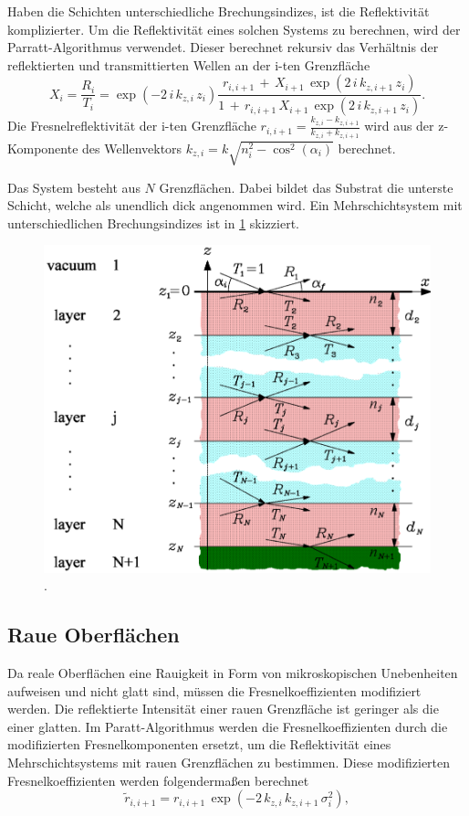 Haben die Schichten unterschiedliche Brechungsindizes, ist die Reflektivität komplizierter. Um die Reflektivität eines solchen Systems zu berechnen, wird der Parratt-Algorithmus verwendet.
Dieser berechnet rekursiv das Verhältnis der reflektierten und transmittierten Wellen an der i-ten Grenzfläche
\begin{equation}
    X_i = \frac{R_i}{T_i} = \exp(-2 \, i \, k_{z,i} \, z_i) \frac{r_{i, i+1} \, + \, X_{i+1} \, \exp(2 \, i \, k_{z,i+1} \, z_i)}{1 \, + \, r_{i,i+1} \, X_{i+1} \, \exp(2 \, i \, k_{z,i+1} \, z_i)}.
    \label{eq:parratt}
\end{equation}
Die Fresnelreflektivität der i-ten Grenzfläche $r_{i, i+1} = \frac{k_{z,i} - k_{z,i+1}}{k_{z,i} + k_{z,i+1}}$ wird aus der z-Komponente des Wellenvektors $k_{z,i} = k \sqrt{n^2_i - \cos^2(\alpha_i)}$ berechnet.

Das System besteht aus $N$ Grenzflächen. Dabei bildet das Substrat die unterste Schicht, welche als unendlich dick angenommen wird.
Ein Mehrschichtsystem mit unterschiedlichen Brechungsindizes ist in \ref{fig:Mehrschicht} skizziert.

\begin{figure}
    \centering
    \includegraphics[width=0.7\linewidth]{./figures/Mehrschicht.png}
    \caption{.}
    \label{fig:Mehrschicht}
\end{figure}



\subsection{Raue Oberflächen}
Da reale Oberflächen eine Rauigkeit in Form von mikroskopischen Unebenheiten aufweisen und nicht glatt sind, müssen die Fresnelkoeffizienten modifiziert werden. Die reflektierte Intensität einer rauen Grenzfläche ist geringer als die einer glatten. Im Paratt-Algorithmus werden die Fresnelkoeffizienten durch die modifizierten Fresnelkomponenten ersetzt, um die Reflektivität eines Mehrschichtsystems mit rauen Grenzflächen zu bestimmen. Diese modifizierten Fresnelkoeffizienten werden folgendermaßen berechnet
\begin{equation}
    \tilde{r}_{i,i+1} = r_{i,i+1} \, \exp(-2 \, k_{z,i} \, k_{z,i+1} \, \sigma^2_i),
\end{equation}


